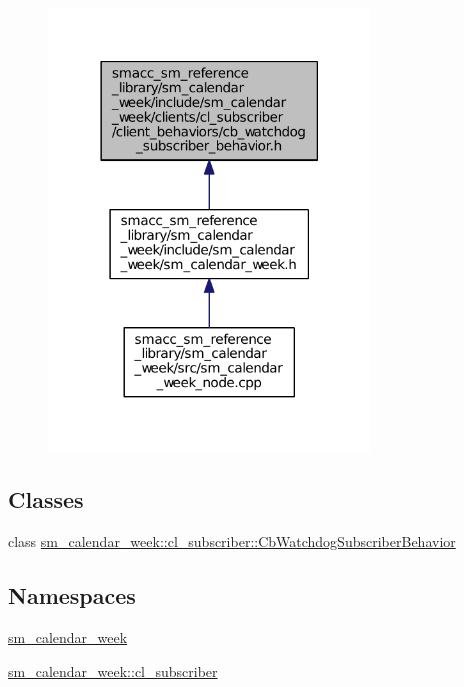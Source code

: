 \begin{figure}[H]
\begin{center}
\leavevmode
\includegraphics[width=242pt]{sm__calendar__week_2include_2sm__calendar__week_2clients_2cl__subscriber_2client__behaviors_2cb_b0580008eb8d0fdc271af90d60893b15}
\end{center}
\end{figure}
\subsection*{Classes}
\begin{DoxyCompactItemize}
\item 
class \hyperlink{classsm__calendar__week_1_1cl__subscriber_1_1CbWatchdogSubscriberBehavior}{sm\+\_\+calendar\+\_\+week\+::cl\+\_\+subscriber\+::\+Cb\+Watchdog\+Subscriber\+Behavior}
\end{DoxyCompactItemize}
\subsection*{Namespaces}
\begin{DoxyCompactItemize}
\item 
 \hyperlink{namespacesm__calendar__week}{sm\+\_\+calendar\+\_\+week}
\item 
 \hyperlink{namespacesm__calendar__week_1_1cl__subscriber}{sm\+\_\+calendar\+\_\+week\+::cl\+\_\+subscriber}
\end{DoxyCompactItemize}
